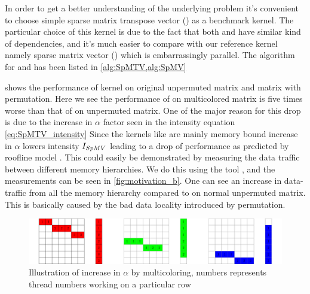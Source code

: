  In order to get a better understanding of the underlying problem it's convenient to choose simple sparse matrix transpose vector (\SpMTV) as a benchmark kernel. The particular choice of this kernel is due to the fact that both \KACZ and \SpMTV have similar kind of dependencies, and it's much easier to compare with our reference kernel namely sparse matrix vector (\SpMV) which is embarrassingly parallel. The algorithm for \SpMTV and \SpMV has been listed in \cref{alg:SpMTV,alg:SpMV}
 
 
  
  shows the performance of \SpMV kernel on original unpermuted matrix and matrix with \MC permutation. Here we see the performance of \SpMV on multicolored matrix is  five times  worse than that of  \SpMV on unpermuted matrix. One of the major reason for this drop is due to the increase in $\alpha$ factor seen in the intensity equation \cref{eq:SpMTV_intensity}  Since the kernels like \SpMV  are mainly memory bound increase in $\alpha$ lowers intensity $I_{SpMV}$ leading to a drop of performance as predicted by roofline model \cite{Williams_roofline}. This could easily be demonstrated by measuring the data traffic between different memory hierarchies.  We do this using the \LIKWID tool \cite{LIKWID}, and the measurements can be seen in \cref{fig:motivation_b}. One can see an increase in data-traffic from all the memory hierarchy compared to \SpMV on normal unpermuted matrix. This is basically caused by the bad data locality introduced by \MCfull permutation.
 
  \begin{figure}[htbp]
  	\centering
  	\includegraphics[scale=0.45]{pics/mc_alpha_problem/mc_alpha}
  	\caption{Illustration of increase in $\alpha$ by multicoloring, numbers represents thread numbers working on a particular row}
  	\label{fig:mc_alpha}
  \end{figure}
  
